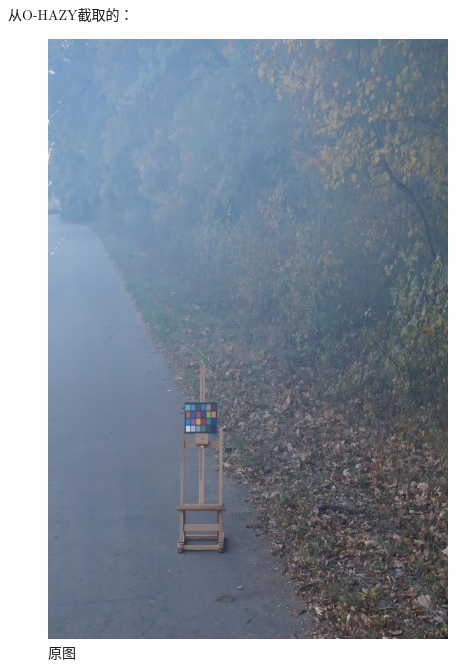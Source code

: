 \documentclass[12pt]{article}
\begin{document}
 从O-HAZY截取的：\begin{figure}[!h]
    \centering
    \begin{minipage}[t]{0.24\linewidth}
        \centering
        \includegraphics[width=0.9\linewidth]{sample_pictures/O-HAZY-example.jpg}
        \caption*{原图}
    \end{minipage}
    \begin{minipage}[t]{0.24\linewidth}
        \centering

\end{minipage}
\end{figure}
\end{document}

